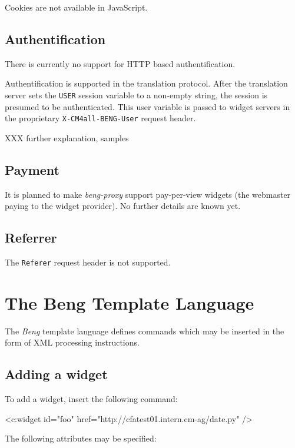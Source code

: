 \documentclass[a4paper,12pt]{article}
\begin{document}
Cookies are not available in JavaScript.

\subsection{Authentification}

There is currently no support for HTTP based authentification.

Authentification is supported in the translation protocol.  After the
translation server sets the \texttt{USER} session variable to a
non-empty string, the session is presumed to be authenticated.  This
user variable is passed to widget servers in the proprietary
\texttt{X-CM4all-BENG-User} request header.

XXX further explanation, samples


\subsection{Payment}

It is planned to make \emph{beng-proxy} support pay-per-view widgets
(the webmaster paying to the widget provider).  No further details are
known yet.


\subsection{Referrer}

The \texttt{Referer} request header is not supported.


\section{The Beng Template Language}
\label{processor}

The \emph{Beng} template language defines commands which may be
inserted in the form of XML processing instructions.

\subsection{Adding a widget}

To add a widget, insert the following command:

\begin{verbatim*}
<c:widget id="foo" href="http://cfatest01.intern.cm-ag/date.py" />
\end{verbatim*}

The following attributes may be specified:
\end{document}
